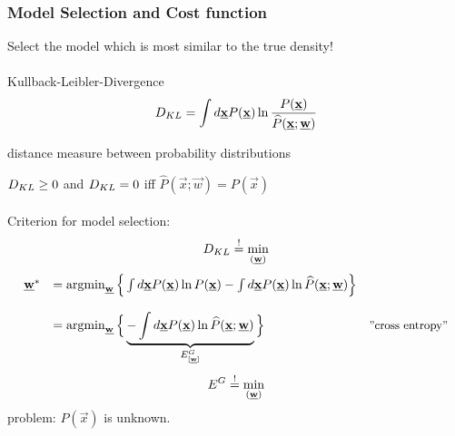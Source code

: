 \subsubsection{Model Selection and Cost function}
Select the model which is most similar to the true density! 
\\\\
Kullback-Leibler-Divergence
\begin{equation}
	D_{KL} = \int d \underline{\mathbf{x}} P(\underline{\mathbf{x}}) \ln 
		\frac{P(\underline{\mathbf{x}})}{\widehat{P}(\underline{\mathbf{x}};\underline{\mathbf{w}})}
\end{equation}
\begin{itemize}
	\itr distance measure between probability distributions
\end{itemize}
$D_{KL} \geq 0$ and $D_{KL} = 0$ iff $\widehat{P}(\vec{x};\vec{w}) = P(\vec{x})$
\\\\
Criterion for model selection:
\begin{equation}
	D_{KL} \stackrel{\mathrm{!}}{=} \min_{(\underline{\mathbf{w}})}
\end{equation}
\begin{equation}
	\begin{array}{lll}
	\vec{w}^* 
	& = \argmin_{\vec{w}} \Big\{ \int d \vec{x} P(\vec{x}) \ln P(\vec{x})
		- \int d \vec{x} P(\vec{x}) \ln \widehat{P}(\vec{x};\vec{w})
		\Big\} \\\\
	& = \argmin_{\vec{w}} \Big\{ \underbrace{ -\int d \vec{x} P(\vec{x}) 
		\ln \widehat{P}(\vec{x};\vec{w}) }_{ E_{[\vec{w}]}^G } \Big\} 
		& \text{{\small ''cross entropy''}}
	\end{array}
\end{equation}
\begin{equation}
	E^G \stackrel{\mathrm{!}}{=} \min_{(\underline{\mathbf{w}})}
\end{equation}
problem: $P(\vec{x})$ is unknown.
\\\\
